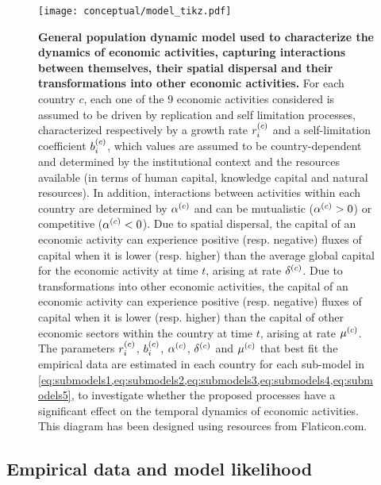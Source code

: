 

\begin{figure}[ht]
  \texttt{[image: conceptual/model\_tikz.pdf]}
  \centering
  \caption{\small
      \textbf{General population dynamic model used to characterize the dynamics of economic activities, capturing interactions between themselves, their spatial dispersal and their transformations into other economic activities.}
      For each country $c$, each one of the 9 economic activities considered is assumed to be driven by replication and self limitation processes, characterized respectively by a growth rate $r_i^{(c)}$ and a self-limitation coefficient $b_i^{(c)}$, which values are assumed to be country-dependent and determined by the institutional context and the resources available (in terms of human capital, knowledge capital and natural resources). 
      In addition, interactions between activities within each country are determined by $\alpha^{(c)}$ and can be mutualistic ($\alpha^{(c)} > 0$) or competitive ($\alpha^{(c)}< 0$).
      Due to spatial dispersal, the capital of an economic activity can experience positive (resp. negative) fluxes of capital when it is lower (resp. higher) than the average global capital for the economic activity at time $t$, arising at rate $\delta^{(c)}$.
      Due to transformations into other economic activities, the capital of an economic activity can experience positive (resp. negative) fluxes of capital when it is lower (resp. higher) than the capital of other economic sectors within the country at time $t$, arising at rate $\mu^{(c)}$.
      The parameters $r_i^{(c)}$, $b_i^{(c)}$, $\alpha^{(c)}$, $\delta^{(c)}$ and $\mu^{(c)}$ that best fit the empirical data are estimated in each country for each sub-model in \cref{eq:submodels1,eq:submodels2,eq:submodels3,eq:submodels4,eq:submodels5}, to investigate whether the proposed processes have a significant effect on the temporal dynamics of economic activities. This diagram has been designed using resources from Flaticon.com.
      }\label{fig:model}
\end{figure}
\FloatBarrier
    
\subsection{Empirical data and model likelihood}

